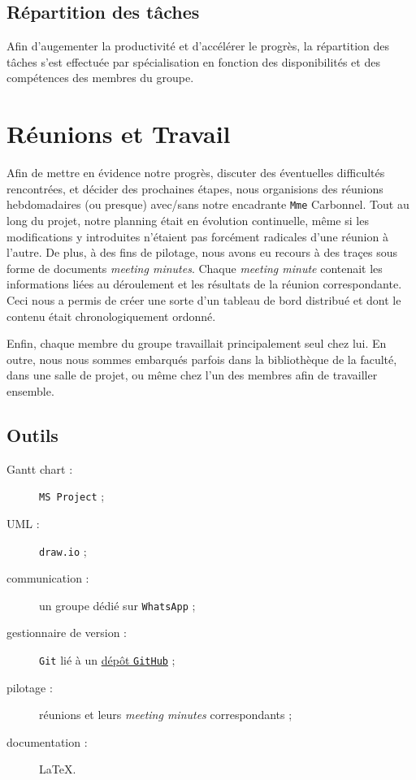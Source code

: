 \documentclass[12pt,a4paper]{report}
\begin{document}
\subsection{Répartition des tâches}
Afin d'augementer la productivité et d'accélérer le progrès, la répartition des tâches s'est effectuée par spécialisation en fonction des disponibilités et des compétences des membres du groupe.

\section{Réunions et Travail}
Afin de mettre en évidence notre progrès, discuter des éventuelles difficultés rencontrées, et décider des prochaines étapes, nous organisions des réunions hebdomadaires (ou presque) avec/sans notre encadrante \texttt{Mme} Carbonnel. Tout au long du projet, notre planning était en évolution continuelle, même si les modifications y introduites n'étaient pas forcément radicales d'une réunion à l'autre. De plus, à des fins de pilotage, nous avons eu recours à des traçes sous forme de documents \textit{meeting minutes}. Chaque \textit{meeting minute} contenait les informations liées au déroulement et les résultats de la réunion correspondante. Ceci nous a permis de créer une sorte d'un tableau de bord distribué et dont le contenu était chronologiquement ordonné.

Enfin, chaque membre du groupe travaillait principalement seul chez lui. En outre, nous nous sommes embarqués parfois dans la bibliothèque de la faculté, dans une salle de projet, ou même chez l'un des membres afin de travailler ensemble.

\subsection{Outils}
\begin{description}
  \item [Gantt chart :] \texttt{MS Project} ;
  \item [UML :] \texttt{draw.io} ;
  \item [communication :] un groupe dédié sur \texttt{WhatsApp} ;
  \item [gestionnaire de version :] \texttt{Git} lié à un \textcolor{OliveGreen}{\href{https://github.com/joe11093/Software-Heritage-TER}{dépôt \texttt{GitHub}}} ;
  \item [pilotage :] réunions et leurs \textit{meeting minutes} correspondants ;
  \item [documentation :] \LaTeX{}.
\end{description}
\end{document}
